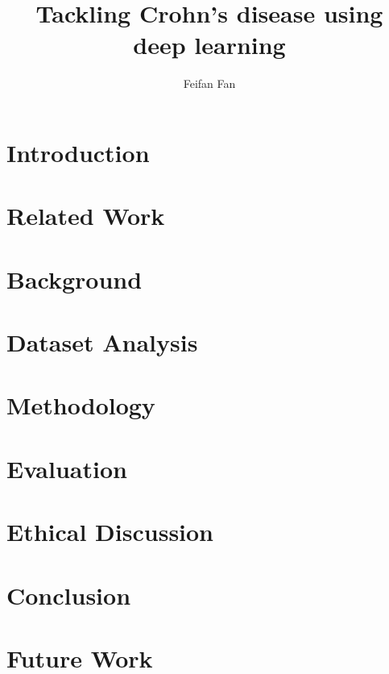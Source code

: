 \documentclass[a4paper,12pt]{report}
\begin{document}
\title{Tackling Crohn's disease using deep learning}
\author{Feifan Fan}





\tableofcontents
\listoffigures

\chapter{Introduction}


\chapter{Related Work}

\chapter{Background}
\label{cha:background}


\chapter{Dataset Analysis}

\chapter{Methodology}
\label{cha:Methodology}


\chapter{Evaluation}
\label{cha:Evaluation}


\chapter{Ethical Discussion}


\chapter{Conclusion}
\label{cha:Conclusion}


\chapter{Future Work}


\end{document}
